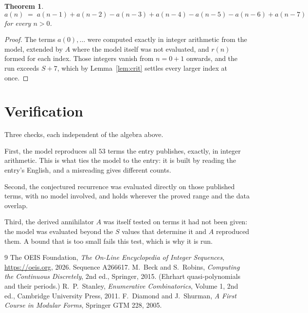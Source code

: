 \documentclass[11pt,a4paper]{article}
\theoremstyle{plain}
\newtheorem{theorem}{Theorem}
\theoremstyle{definition}
\begin{document}
\begin{theorem}
\[
a(n)\;=\;a(n-1) + a(n-2) - a(n-3) + a(n-4) - a(n-5) - a(n-6) + a(n-7)
\]
for every $n>0$.
\end{theorem}

\begin{proof}
The terms $a(0),\dots$ were computed exactly in integer arithmetic from the model, extended by
$A$ where the model itself was not evaluated, and $r(n)$ formed for each index. Those integers
vanish from $n=0+1$ onwards, and the run exceeds $S+7$, which by
Lemma~\ref{lem:crit} settles every larger index at once.
\end{proof}

\section{Verification}

Three checks, each independent of the algebra above.

First, the model reproduces all $53$ terms the entry publishes, exactly, in integer
arithmetic. This is what ties the model to the entry: it is built by reading the entry's
English, and a misreading gives different counts.

Second, the conjectured recurrence was evaluated directly on those published terms, with no
model involved, and holds wherever the proved range and the data overlap.

Third, the derived annihilator $A$ was itself tested on terms it had not been given: the model
was evaluated beyond the $S$ values that determine it and $A$ reproduced them. A bound that is
too small fails this test, which is why it is run.

\begin{thebibliography}{9}
 The OEIS Foundation, \emph{The On-Line Encyclopedia of Integer
Sequences}, \url{https://oeis.org}, 2026. Sequence A266617.
 M.~Beck and S.~Robins, \emph{Computing the Continuous Discretely},
2nd ed., Springer, 2015. (Ehrhart quasi-polynomials and their periods.)
 R.~P.~Stanley, \emph{Enumerative Combinatorics}, Volume 1, 2nd ed.,
Cambridge University Press, 2011.
 F.~Diamond and J.~Shurman, \emph{A First Course in Modular Forms},
Springer GTM 228, 2005.
\end{thebibliography}
\end{document}

